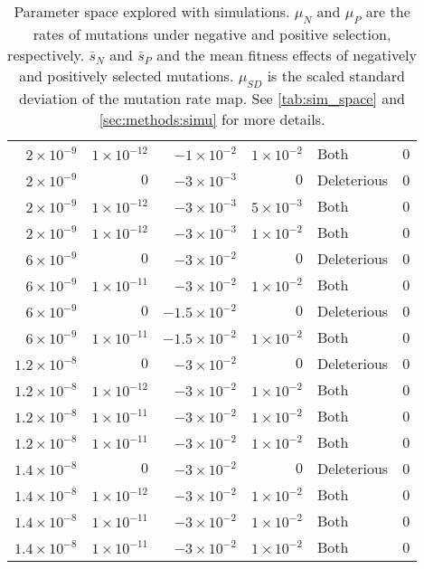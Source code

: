 \begin{table}[ht]
\begin{tabular}{rrrrll}
  $2 \times 10^{-9}$ & $1 \times 10^{-12}$ & $-1 \times 10^{-2}$ & $1 \times 10^{-2}$ & Both & 0 \\ 
  $2 \times 10^{-9}$ & $0$ & $-3 \times 10^{-3}$ & $0$ & Deleterious & 0 \\ 
  $2 \times 10^{-9}$ & $1 \times 10^{-12}$ & $-3 \times 10^{-3}$ & $5 \times 10^{-3}$ & Both & 0 \\ 
  $2 \times 10^{-9}$ & $1 \times 10^{-12}$ & $-3 \times 10^{-3}$ & $1 \times 10^{-2}$ & Both & 0 \\ 
  $6 \times 10^{-9}$ & $0$ & $-3 \times 10^{-2}$ & $0$ & Deleterious & 0 \\ 
  $6 \times 10^{-9}$ & $1 \times 10^{-11}$ & $-3 \times 10^{-2}$ & $1 \times 10^{-2}$ & Both & 0 \\ 
  $6 \times 10^{-9}$ & $0$ & $-1.5 \times 10^{-2}$ & $0$ & Deleterious & 0 \\ 
  $6 \times 10^{-9}$ & $1 \times 10^{-11}$ & $-1.5 \times 10^{-2}$ & $1 \times 10^{-2}$ & Both & 0 \\ 
  $1.2 \times 10^{-8}$ & $0$ & $-3 \times 10^{-2}$ & $0$ & Deleterious & 0 \\ 
  $1.2 \times 10^{-8}$ & $1 \times 10^{-12}$ & $-3 \times 10^{-2}$ & $1 \times 10^{-2}$ & Both & 0 \\ 
  $1.2 \times 10^{-8}$ & $1 \times 10^{-11}$ & $-3 \times 10^{-2}$ & $1 \times 10^{-2}$ & Both & 0 \\ 
  $1.2 \times 10^{-8}$ & $1 \times 10^{-11}$ & $-3 \times 10^{-2}$ & $1 \times 10^{-2}$ & Both & 0 \\ 
  $1.4 \times 10^{-8}$ & $0$ & $-3 \times 10^{-2}$ & $0$ & Deleterious & 0 \\ 
  $1.4 \times 10^{-8}$ & $1 \times 10^{-12}$ & $-3 \times 10^{-2}$ & $1 \times 10^{-2}$ & Both & 0 \\ 
  $1.4 \times 10^{-8}$ & $1 \times 10^{-11}$ & $-3 \times 10^{-2}$ & $1 \times 10^{-2}$ & Both & 0 \\ 
  $1.4 \times 10^{-8}$ & $1 \times 10^{-11}$ & $-3 \times 10^{-2}$ & $1 \times 10^{-2}$ & Both & 0 \\ 
   \hline
\end{tabular}
\label{tab:sim_params}
\caption{Parameter space explored with simulations. $\mu_N$ and $\mu_P$ are the rates of mutations under negative and positive selection, respectively.
$\bar{s}_N$ and $\bar{s}_P$ and the mean fitness effects of negatively and positively selected mutations. $\mu_{SD}$ is the scaled standard deviation of the mutation rate map. See \autoref{tab:sim_space} and \autoref{sec:methods:simu} for more details.} 
\end{table}


